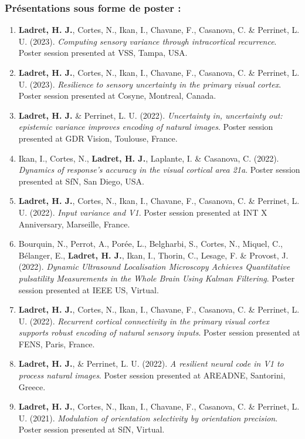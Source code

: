 \subsubsection*{Présentations sous forme de poster :}
\begin{enumerate}
\item \textbf{Ladret, H. J.}, Cortes, N., Ikan, I., Chavane, F., Casanova, C. \& Perrinet, L. U. (2023). \textit{Computing sensory variance through intracortical recurrence}. Poster session presented at VSS, Tampa, USA.
\item \textbf{Ladret, H. J.}, Cortes, N., Ikan, I., Chavane, F., Casanova, C. \& Perrinet, L. U. (2023). \textit{Resilience to sensory uncertainty in the primary visual cortex}. Poster session presented at Cosyne, Montreal, Canada. 
\item \textbf{Ladret, H. J.} \& Perrinet, L. U. (2022). \textit{Uncertainty in, uncertainty out: epistemic variance improves encoding of natural images}. Poster session presented at GDR Vision, Toulouse, France.
\item Ikan, I., Cortes, N., \textbf{Ladret, H. J.}, Laplante, I. \& Casanova, C. (2022). \textit{Dynamics of response’s accuracy in the visual cortical area 21a}. Poster session presented at SfN, San Diego, USA. 
\item \textbf{Ladret, H. J.}, Cortes, N., Ikan, I., Chavane, F., Casanova, C. \& Perrinet, L. U. (2022). \textit{Input variance and V1}. Poster session presented at INT X Anniversary, Marseille, France.
\item Bourquin, N., Perrot, A., Porée, L., Belgharbi, S., Cortes, N., Miquel, C., Bélanger, E., \textbf{Ladret, H. J.}, Ikan, I., Thorin, C., Lesage, F. \& Provost, J. (2022). \textit{Dynamic Ultrasound Localisation Microscopy Achieves Quantitative pulsatility Measurements in the Whole Brain Using Kalman Filtering}. Poster session presented at IEEE US, Virtual.
\item \textbf{Ladret, H. J.}, Cortes, N., Ikan, I., Chavane, F., Casanova, C. \& Perrinet, L. U. (2022). \textit{Recurrent cortical connectivity in the primary visual cortex supports robust encoding of natural sensory inputs}. Poster session presented at FENS, Paris, France. 
\item \textbf{Ladret, H. J.}, \& Perrinet, L. U. (2022). \textit{A resilient neural code in V1 to process natural images}. Poster session presented at AREADNE, Santorini, Greece. 
\item \textbf{Ladret, H. J.}, Cortes, N., Ikan, I., Chavane, F., Casanova, C. \& Perrinet, L. U. (2021). \textit{Modulation of orientation selectivity by orientation precision}. Poster session presented at SfN, Virtual. 

\end{enumerate}
